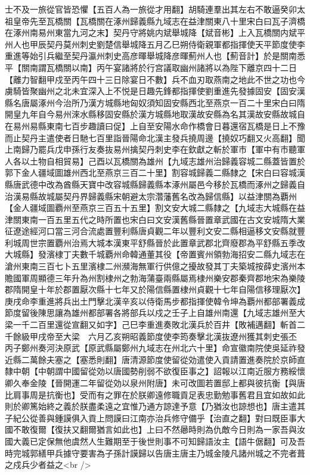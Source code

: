 士不及一旅從官皆恐懼【五百人為一旅從才用翻】胡騎連羣出其左右不敢逼癸卯太祖皇帝先至瓦橋關【瓦橋關在涿州歸義縣九域志在益津關東八十里宋白曰瓦子濟橋在涿州南易州東當九河之末】契丹守將姚内斌舉城降【斌音彬】上入瓦橋關内斌平州人也甲辰契丹莫州刺史劉楚信舉城降五月乙巳朔侍衛親軍都指揮使天平節度使李重進等始引兵繼至契丹瀛州刺史高彦暉舉城降彦暉薊州人也【薊音計】於是關南悉平【關南謂瓦橋關以南】丙午宴諸將於行宫議取幽州諸將以為陛下離京四十二日【離力智翻甲戍至丙午四十三日除宴日不數】兵不血刃取燕南之地此不世之功也今虜騎皆聚幽州之北未宜深入上不悦是日趣先鋒都指揮使劉重進先發據固安【固安漢縣名唐屬涿州今治所乃漢方城縣地匈奴須知固安縣西北至燕京一百二十里宋白曰隋開皇九年自今易州淶水縣移固安縣於漢方城縣地取漢故安縣為名其漢故安縣故城自在易州易縣東南七百步趣讀曰促】上自至安陽水命作橋會日暮還宿瓦橋是日上不豫而止契丹主遣使者日馳七百里詣晉陽命北漢主發兵撓周邊【撓奴巧翻又火高翻】聞上南歸乃罷兵戊申孫行友奏抜易州擒契丹刺史李在欽獻之斬於軍市【軍中有市聽軍人各以土物自相貿易】己酉以瓦橋關為雄州【九域志雄州治歸義容城二縣蓋皆置於郭下金人疆域圖雄州西北至燕京三百二十里】割容城歸義二縣隸之【宋白曰容城漢縣唐武德中改為酋縣天寶中改容城縣歸義縣本涿州屬邑今移於瓦橋而涿州之歸義自治漢易縣故城屬契丹界歸義縣宋朝避太宗濳藩舊名改為歸信縣】以益津關為覇州【金人疆域圖覇州至燕京三百五十五里】割文安大城二縣隸之【九域志大城縣在益津關東南一百五里五代之時所置也宋白曰文安漢舊縣晉置章武國在古文安城隋大業征遼途經河口當三河合流處置豐利縣唐貞觀二年以豐利文安二縣相逼移文安縣就豐利城周世宗置覇州治焉大城本漢東平舒縣晉於此置章武郡北齊廢郡為平舒縣五季改大城縣】發濱棣丁夫數千城覇州命韓通董其役【帝置賓州領勃海招安二縣九域志在滄州東南三百七卜五里濱棣二州瀕海無軍行供億之擾故發其丁夫築城按薛史濱州本贍國軍周顯德三年升為州割棣州之勃海蒲臺兩縣屬焉棣州樂安郡秦齊郡地宋為樂陵郡隋開皇十年於郡置厭次縣十七年又於陽信縣置棣州貞觀十七年自陽信移理厭次】庚戌命李重進將兵出土門擊北漢辛亥以侍衛馬步都指揮使韓令坤為覇州都部署義成節度留後陳思讓為雄州都部署各將部兵以戍之壬子上自雄州南還【九域志雄州至大梁一千二百里還從宣翻又如字】己巳李重進奏敗北漢兵於百井【敗補邁翻】斬首二千餘級甲戌帝至大梁　六月乙亥朔昭義節度使李筠奏擊北漢抜遼州獲其刺史張丕　丙子鄭州奏河決原武【原武縣屬鄭州九域志在州北六十里】命宣徽南院使吳延祚發近縣二萬餘夫塞之【塞悉則翻】唐清源節度使留從効遣使入貢請置進奏院於京師直隸中朝【中朝謂中國留從効以唐國勢削弱不欲復臣事之】詔報以江南近服方務綏懷卿久奉金陵【晉開運二年留從効以泉州附唐】未可改圖若置邸上都與彼抗衡【與唐比肩事周是抗衡也】受而有之罪在於朕卿遠修職貢足表忠勤勉事舊君且宜如故如此則於卿篤始終之義於朕盡柔遠之宜惟乃通方諒達予意【乃猶汝也諒想也】唐主遣其子紀公從善與鍾謨俱入貢上問謨曰江南亦治兵修守備乎【治直之翻】對曰既臣事大國不敢復爾【復扶又翻爾猶言如此也】上曰不然曏時則為仇敵今日則為一家吾與汝國大義已定保無他虞然人生難期至于後世則事不可知歸語汝主【語牛倨翻】可及吾時完城郭繕甲兵據守要害為子孫計謨歸以告唐主唐主乃城金陵凡諸州城之不完者葺之戍兵少者益之<br />
